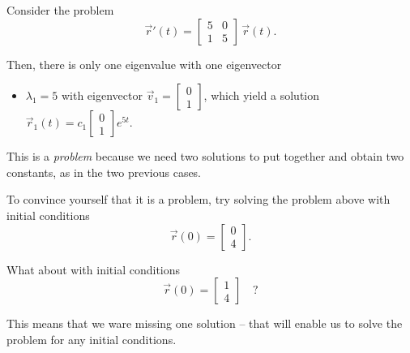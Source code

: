 \begin{example}
Consider the problem
$$
\vec{r}'(t) = \begin{bmatrix}	
 5 & 0 \\ 1 & 5	
 \end{bmatrix} \, \vec{r}(t).
$$

Then, there is only one eigenvalue with one eigenvector
\begin{itemize}
	\item $\lambda_1=5$ with eigenvector $\vec{v}_1 = \begin{bmatrix} 0 \\ 1 \end{bmatrix}$, which yield a solution $\vec{r}_1(t) = c_1 \begin{bmatrix} 0 \\ 1 \end{bmatrix} e^{5t}$.
\end{itemize}

This is a \emph{problem} because we need two solutions to put together and obtain two constants, as in the two previous cases.

\begin{graybox}
To convince yourself that it is a problem, try solving the problem above with initial conditions
$$
\vec{r}(0) = \begin{bmatrix}	0 \\ 4 \end{bmatrix}.
$$

What about with initial conditions
$$
\vec{r}(0) = \begin{bmatrix}	 1 \\ 4 \end{bmatrix} \quad ?
$$
\end{graybox}


This means that we ware missing one solution -- that will enable us to solve the problem for any initial conditions. \\



\end{example}
